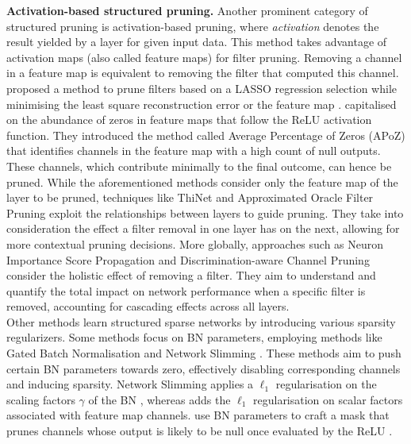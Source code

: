 \noindent\textbf{Activation-based structured pruning.} Another prominent
category of structured pruning is activation-based pruning, where
\emph{activation} denotes the result yielded by a layer for given input data.
This method takes advantage of activation maps (also called feature maps) for
filter pruning. Removing a channel in a feature map is equivalent to removing
the filter that computed this channel. \citeauthor{DBLP:conf/iccv/HeZS17}
proposed a method to prune filters based on a LASSO regression selection while
minimising the least square reconstruction error or the feature map
\cite{DBLP:conf/iccv/HeZS17}. \citeauthor{DBLP:journals/corr/HuPTT16}
capitalised on the abundance of zeros in feature maps that follow the \ac{ReLU}
activation function. They introduced the method called Average Percentage of
Zeros (APoZ) that identifies channels in the feature map with a high count of
null outputs. These channels, which contribute minimally to the final outcome,
can hence be pruned. While the aforementioned methods consider only the feature
map of the layer to be pruned, techniques like ThiNet
\cite{DBLP:conf/iccv/LuoWL17} and Approximated Oracle Filter Pruning
\cite{DBLP:conf/icml/DingDGHY19} exploit the relationships between layers to
guide pruning. They take into consideration the effect a filter removal in one
layer has on the next, allowing for more contextual pruning decisions. More
globally, approaches such as Neuron Importance Score Propagation
\cite{DBLP:conf/cvpr/Yu00LMHGLD18} and Discrimination-aware Channel Pruning
\cite{DBLP:conf/nips/ZhuangTZLGWHZ18} consider the holistic effect of removing a
filter. They aim to understand and quantify the total impact on network
performance when a specific filter is removed, accounting for cascading effects
across all layers.\\

Other methods learn structured sparse networks by introducing various sparsity
regularizers. Some methods focus on \acl{BN} parameters, employing methods like
Gated Batch Normalisation \cite{DBLP:conf/nips/YouYYM019} and Network Slimming
\cite{DBLP:conf/iccv/LiuLSHYZ17}. These methods aim to push certain BN
parameters towards zero, effectively disabling corresponding channels and
inducing sparsity. Network Slimming applies a $\ell_1$ regularisation on the
scaling factors $\gamma$ of the \ac{BN} \cite{DBLP:conf/iccv/LiuLSHYZ17},
whereas \cite{DBLP:conf/nips/YouYYM019} adds the $\ell_1$ regularisation on
scalar factors associated with feature map channels.
\citeauthor{DBLP:conf/icml/KangH20} use \ac{BN} parameters to craft a mask that
prunes channels whose output is likely to be null once evaluated by the \ac{ReLU}
\cite{DBLP:conf/icml/KangH20}. \\

